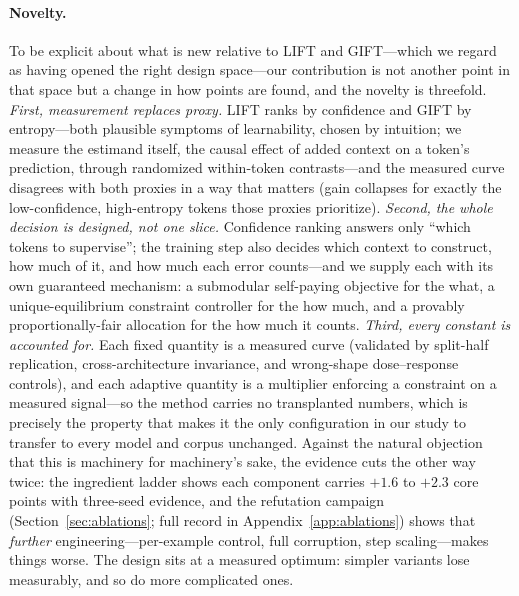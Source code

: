\documentclass{article} %
\begin{document}
\paragraph{Novelty.} To be explicit about what is new relative to LIFT and GIFT---which we regard as having opened the right design space---our contribution is not another point in that space but a change in how points are found, and the novelty is threefold. \emph{First, measurement replaces proxy.} LIFT ranks by confidence and GIFT by entropy---both plausible symptoms of learnability, chosen by intuition; we measure the estimand itself, the causal effect of added context on a token's prediction, through randomized within-token contrasts---and the measured curve disagrees with both proxies in a way that matters (gain collapses for exactly the low-confidence, high-entropy tokens those proxies prioritize). \emph{Second, the whole decision is designed, not one slice.} Confidence ranking answers only ``which tokens to supervise''; the training step also decides which context to construct, how much of it, and how much each error counts---and we supply each with its own guaranteed mechanism: a submodular self-paying objective for the what, a unique-equilibrium constraint controller for the how much, and a provably proportionally-fair allocation for the how much it counts. \emph{Third, every constant is accounted for.} Each fixed quantity is a measured curve (validated by split-half replication, cross-architecture invariance, and wrong-shape dose--response controls), and each adaptive quantity is a multiplier enforcing a constraint on a measured signal---so the method carries no transplanted numbers, which is precisely the property that makes it the only configuration in our study to transfer to every model and corpus unchanged. Against the natural objection that this is machinery for machinery's sake, the evidence cuts the other way twice: the ingredient ladder shows each component carries $+1.6$ to $+2.3$ core points with three-seed evidence, and the refutation campaign (Section~\ref{sec:ablations}; full record in Appendix~\ref{app:ablations}) shows that \emph{further} engineering---per-example control, full corruption, step scaling---makes things worse. The design sits at a measured optimum: simpler variants lose measurably, and so do more complicated ones.
\end{document}
